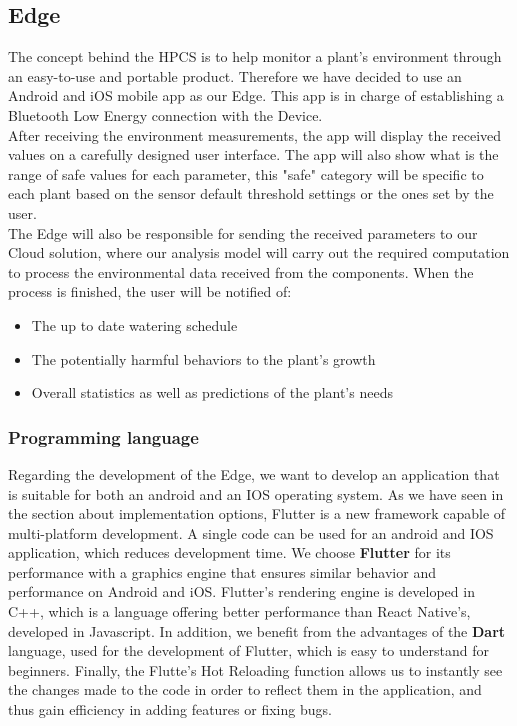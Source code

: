 \subsection{Edge}
The concept behind the HPCS is to help monitor a plant's environment through an easy-to-use and portable product. Therefore we have decided to use an Android and iOS mobile app as our Edge. This app is in charge of establishing a Bluetooth Low Energy connection with the Device. \\
After receiving the environment measurements, the app will display the received values on a carefully designed user interface. The app will also show what is the range of safe values for each parameter, this "safe" category will be specific to each plant based on the sensor default threshold settings or the ones set by the user. \\
The Edge will also be responsible for sending the received parameters to our Cloud solution, where our analysis model will carry out the required computation to process the environmental data received from the components. When the process is finished, the user will be notified of:
\begin{itemize}
    \item The up to date watering schedule
    \item The potentially harmful behaviors to the plant's growth
    \item Overall statistics as well as predictions of the plant's needs\\
\end{itemize}

\subsubsection*{Programming language}
Regarding the development of the Edge, we want to develop an application that is suitable for both an android and an IOS operating system. As we have seen in the section about implementation options, Flutter is a new framework capable of multi-platform development. A single code can be used for an android and IOS application, which reduces development time.
We choose \textbf{Flutter} for its performance with a graphics engine that ensures similar behavior and performance on Android and iOS. Flutter's rendering engine is developed in C++, which is a language offering better performance than React Native's, developed in Javascript.
In addition, we benefit from the advantages of the \textbf{Dart} language, used for the development of Flutter, which is easy to understand for beginners.
Finally, the Flutte's Hot Reloading function allows us to instantly see the changes made to the code in order to reflect them in the application, and thus gain efficiency in adding features or fixing bugs.\\

